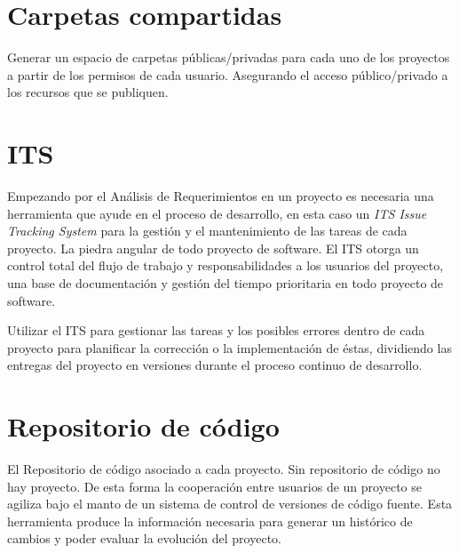 
\section{Carpetas compartidas}
\label{sec:carpetas-compartidas}

\par Generar un espacio de carpetas p\'ublicas/privadas para cada uno de los proyectos a partir de los permisos de cada usuario. Asegurando el acceso público/privado a los recursos que se publiquen.


\section{ITS}
\label{sec:its}

\par Empezando por el An\'alisis de Requerimientos en un proyecto es necesaria una herramienta que ayude en el proceso de desarrollo, en esta caso un \emph{ITS Issue Tracking System} para la gestión y el mantenimiento de las tareas de cada proyecto. La piedra angular de todo proyecto de software. El ITS otorga un control total del flujo de trabajo y responsabilidades a los usuarios del proyecto, una base de documentación y gestión del tiempo prioritaria en todo proyecto de software.

\par Utilizar el ITS para gestionar las tareas y los posibles errores dentro de cada proyecto para planificar la corrección o la implementación de éstas, dividiendo las entregas del proyecto en versiones durante el proceso continuo de desarrollo.


\section{Repositorio de código}
\label{sec:repositorio-codigo}

\par El Repositorio de c\'odigo asociado a cada proyecto. Sin repositorio de código no hay proyecto. De esta forma la cooperación entre usuarios de un proyecto se agiliza bajo el manto de un sistema de control de versiones de código fuente. Esta herramienta produce la información necesaria para generar un histórico de cambios y poder evaluar la evolución del proyecto.

